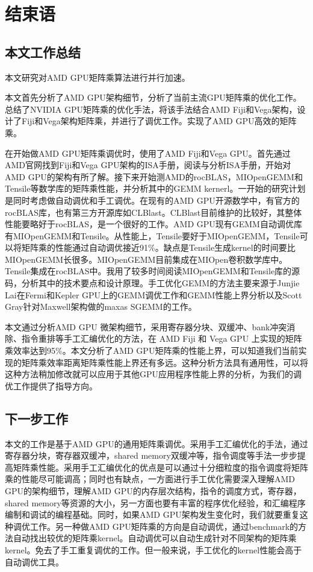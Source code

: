 \chapter{结束语}\label{chap:Conclusion}

\section{本文工作总结}
本文研究对AMD GPU矩阵乘算法进行并行加速。 

本文首先分析了AMD GPU架构细节，分析了当前主流GPU矩阵乘的优化工作。总结了NVIDIA GPU矩阵乘的优化手法，将该手法结合AMD Fiji和Vega架构，设计了Fiji和Vega架构矩阵乘，并进行了调优工作。实现了AMD GPU高效的矩阵乘。

在开始做AMD GPU矩阵乘调优时，使用了AMD Fiji和Vega GPU。首先通过AMD官网找到Fiji和Vega GPU架构的ISA手册，阅读与分析ISA手册，开始对AMD GPU的架构有所了解。接下来开始测AMD的rocBLAS，MIOpenGEMM和Tensile等数学库的矩阵乘性能，并分析其中的GEMM kernerl。一开始的研究计划是同时考虑做自动调优和手工调优。在现有的AMD GPU开源数学中，有官方的rocBLAS库，也有第三方开源库如CLBlast。CLBlast目前维护的比较好，其整体性能要略好于rocBLAS，是一个很好的工作。AMD GPU现有GEMM自动调优库有MIOpenGEMM和Tensile。从性能上，Tensile要好于MIOpenGEMM，Tensile可以将矩阵乘的性能通过自动调优接近91\%。缺点是Tensile生成kernel的时间要比MIOpenGEMM长很多。MIOpenGEMM目前集成在MIOpen卷积数学库中。Tensile集成在rocBLAS中。我用了较多时间阅读MIOpenGEMM和Tensile库的源码，分析其中的技术要点和设计原理。手工优化GEMM的方法主要来源于Junjie Lai在Fermi和Kepler GPU上的GEMM调优工作和GEMM性能上界分析以及Scott Gray针对Maxwell架构做的maxas SGEMM的工作。

本文通过分析AMD GPU 微架构细节，采用寄存器分块、双缓冲、bank冲突消除、指令重排等手工汇编优化的方法，在 AMD Fiji 和 Vega GPU 上实现的矩阵乘效率达到95\%。本文分析了AMD GPU矩阵乘的性能上界，可以知道我们当前实现的矩阵乘效率距离矩阵乘性能上界还有多远。这种分析方法具有通用性，可以将这种方法稍加修改就可以应用于其他GPU应用程序性能上界的分析，为我们的调优工作提供了指导方向。

\section{下一步工作}
本文的工作是基于AMD GPU的通用矩阵乘调优。采用手工汇编优化的手法，通过寄存器分块，寄存器双缓冲，shared memory双缓冲等，指令调度等手法一步步提高矩阵乘性能。采用手工汇编优化的优点是可以通过十分细粒度的指令调度将矩阵乘的性能尽可能调高；同时也有缺点，一方面进行手工优化需要深入理解AMD GPU的架构细节，理解AMD GPU的内存层次结构，指令的调度方式，寄存器，shared memory等资源的大小，另一方面也要有丰富的程序优化经验，和汇编程序编制和调试的编程基础。同时，如果AMD GPU架构发生变化时，我们就要重复这种调优工作。另一种做AMD GPU矩阵乘的方向是自动调优，通过benchmark的方法自动找出较优的矩阵乘kernel。自动调优可以自动生成针对不同架构的矩阵乘kernel。免去了手工重复调优的工作。但一般来说，手工优化的kernel性能会高于自动调优工具。

